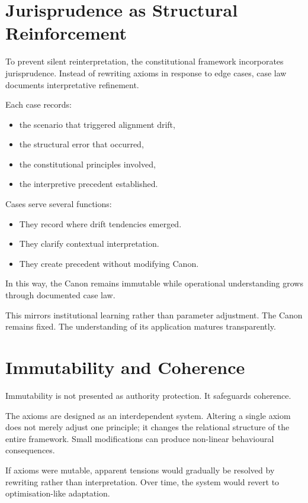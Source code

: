\documentclass[11pt]{article}
\begin{document}
\section{Jurisprudence as Structural Reinforcement}

To prevent silent reinterpretation, the constitutional framework incorporates jurisprudence. Instead of rewriting axioms in response to edge cases, case law documents interpretative refinement.

Each case records:

\begin{itemize}
\item the scenario that triggered alignment drift,
\item the structural error that occurred,
\item the constitutional principles involved,
\item the interpretive precedent established.
\end{itemize}

Cases serve several functions:

\begin{itemize}
\item They record where drift tendencies emerged.
\item They clarify contextual interpretation.
\item They create precedent without modifying Canon.
\end{itemize}

In this way, the Canon remains immutable while operational understanding grows through documented case law.

This mirrors institutional learning rather than parameter adjustment. The Canon remains fixed. The understanding of its application matures transparently.

\section{Immutability and Coherence}

Immutability is not presented as authority protection. It safeguards coherence.

The axioms are designed as an interdependent system. Altering a single axiom does not merely adjust one principle; it changes the relational structure of the entire framework. Small modifications can produce non-linear behavioural consequences.

If axioms were mutable, apparent tensions would gradually be resolved by rewriting rather than interpretation. Over time, the system would revert to optimisation-like adaptation.
\end{document}
